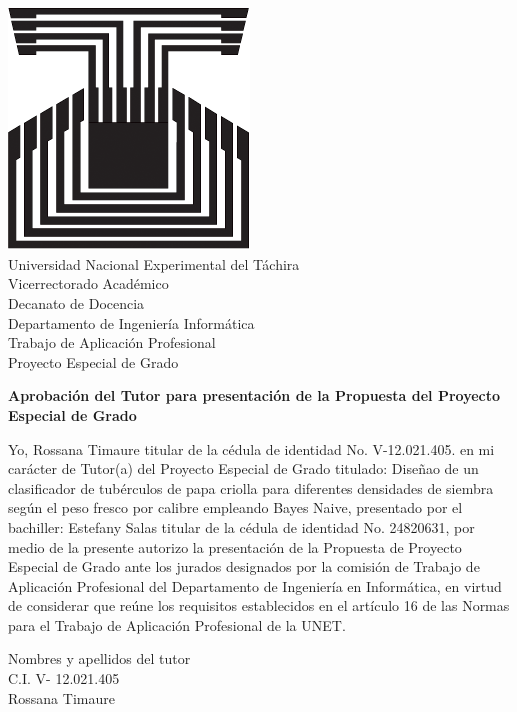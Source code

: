 \chapter*{}
\pagestyle{empty}
\thispagestyle{empty}


\begin{center}
\includegraphics[scale=0.2]{unet.jpg}\\

Universidad Nacional Experimental del T\'achira\\

Vicerrectorado Acad\'emico\\

Decanato de Docencia\\

Departamento de Ingenier\'ia Inform\'atica\\

Trabajo de Aplicaci\'on Profesional\\

Proyecto Especial de Grado\\

\end{center}

\begin{center}
\textbf{Aprobaci\'on del Tutor para presentaci\'on de la Propuesta del Proyecto Especial de Grado}
\end{center}

	Yo,  Rossana Timaure  titular de la c\'edula de identidad No. V-12.021.405.  en mi car\'acter de Tutor(a) del Proyecto Especial de Grado titulado: Diseñao de un clasificador de tubérculos de papa criolla para diferentes densidades de siembra según el peso fresco por calibre empleando Bayes Naive, presentado por el bachiller: Estefany Salas titular de la c\'edula de identidad No. 24820631, por medio de la presente autorizo la presentaci\'on de la Propuesta de Proyecto Especial de Grado ante los jurados designados por la comisi\'on de Trabajo de Aplicaci\'on Profesional del Departamento de Ingenier\'ia en Inform\'atica, en virtud de considerar que re\'une los requisitos establecidos en el art\'iculo 16 de las Normas para el Trabajo de Aplicaci\'on Profesional de la UNET.\\
	
	
	\begin{center}
	Nombres y apellidos del tutor\\
	
	C.I. V- 12.021.405\\
Rossana Timaure\\
	\end{center}
